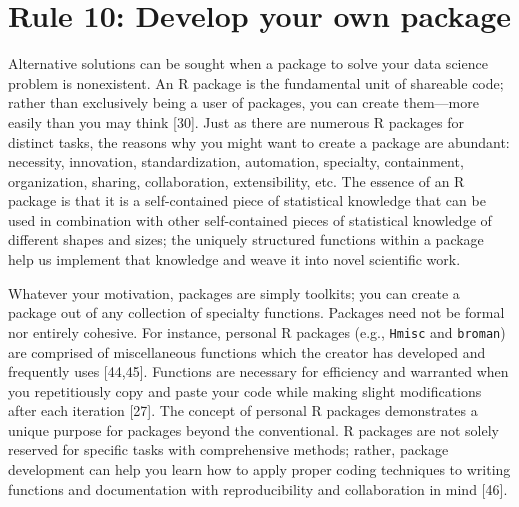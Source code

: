 \documentclass[10pt,letterpaper]{article}
\begin{document}
\hypertarget{rule-10-develop-your-own-package}{%
\section{Rule 10: Develop your own
package}\label{rule-10-develop-your-own-package}}

Alternative solutions can be sought when a package to solve your data
science problem is nonexistent. An R package is the fundamental unit of
shareable code; rather than exclusively being a user of packages, you
can create them---more easily than you may think {[}30{]}. Just as there
are numerous R packages for distinct tasks, the reasons why you might
want to create a package are abundant: necessity, innovation,
standardization, automation, specialty, containment, organization,
sharing, collaboration, extensibility, etc. The essence of an R package
is that it is a self-contained piece of statistical knowledge that can
be used in combination with other self-contained pieces of statistical
knowledge of different shapes and sizes; the uniquely structured
functions within a package help us implement that knowledge and weave it
into novel scientific work.

Whatever your motivation, packages are simply toolkits; you can create a
package out of any collection of specialty functions. Packages need not
be formal nor entirely cohesive. For instance, personal R packages
(e.g., \texttt{Hmisc} and \texttt{broman}) are comprised of
miscellaneous functions which the creator has developed and frequently
uses {[}44,45{]}. Functions are necessary for efficiency and warranted
when you repetitiously copy and paste your code while making slight
modifications after each iteration {[}27{]}. The concept of personal R
packages demonstrates a unique purpose for packages beyond the
conventional. R packages are not solely reserved for specific tasks with
comprehensive methods; rather, package development can help you learn
how to apply proper coding techniques to writing functions and
documentation with reproducibility and collaboration in mind {[}46{]}.
\end{document}
